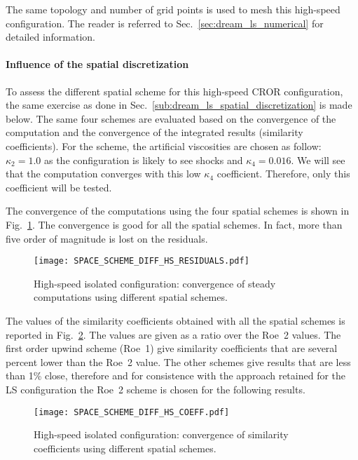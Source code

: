 
The same topology and number of grid points is used to
mesh this high-speed configuration. The reader is referred to 
Sec.~\ref{sec:dream_ls_numerical} for detailed information.

\paragraph{Influence of the spatial discretization}
\label{sub:dream_hs_spatial_discretization}

To assess the different spatial scheme for this high-speed
CROR configuration, the same exercise as done in 
Sec.~\ref{sub:dream_ls_spatial_discretization} is made below.
The same four schemes are evaluated based 
on the convergence of the computation
and the convergence of the integrated 
results (similarity coefficients).
For the \citet{Jameson1981} scheme, the artificial viscosities
are chosen as follow: $\kappa_2 = 1.0$ as the configuration is likely to 
see shocks and $\kappa_4 = 0.016$. We will see that the computation converges
with this low $\kappa_4$ coefficient. Therefore, only this coefficient
will be tested.

The convergence of the computations using the four spatial schemes
is shown in Fig.~\ref{fig:DREAM_HS_RESIDUALS_PPT}. The convergence is good
for all the spatial schemes. In fact, more than five order of magnitude
is lost on the residuals.
\begin{figure}[htp]
  \centering
  \texttt{[image: SPACE\_SCHEME\_DIFF\_HS\_RESIDUALS.pdf]}
  \caption{High-speed isolated configuration: convergence 
  of steady computations using different spatial schemes.}
  \label{fig:DREAM_HS_RESIDUALS_PPT}
\end{figure}

The values of the similarity coefficients obtained with
all the spatial schemes is reported in 
Fig.~\ref{fig:dream_hs_space_scheme_coeff}. The values are
given as a ratio over the Roe~2 values. The first order
upwind scheme (Roe~1) give similarity coefficients that are
several percent lower than the Roe~2 value. The other schemes
give results that are less than 1\% close, therefore and for
consistence with the approach retained for the LS configuration
the Roe~2 scheme is chosen for the following results.
\begin{figure}[htp]
  \centering
  \texttt{[image: SPACE\_SCHEME\_DIFF\_HS\_COEFF.pdf]}
  \caption{High-speed isolated configuration: convergence of 
  similarity coefficients using different spatial schemes.}
  \label{fig:dream_hs_space_scheme_coeff}
\end{figure}


